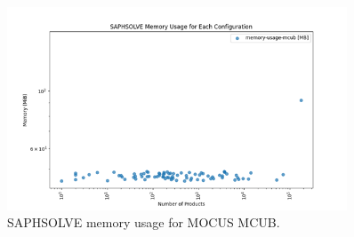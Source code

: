 \begin{figure}[H]
    \centering
    \includegraphics[width=0.9\textwidth]{3_identifying_gaps/benchmarking/profiling_methods/figures/saphsolve_memory_usage.png}
    \caption{SAPHSOLVE memory usage for MOCUS MCUB.}
    \label{fig:saphsolve_memory_usage}
\end{figure}